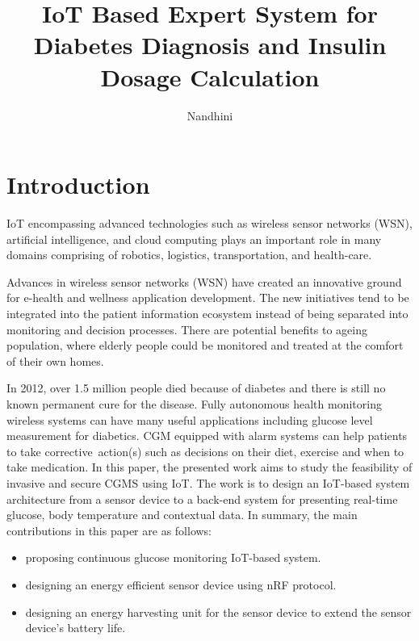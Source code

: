 \documentclass{article}
\begin{document}
\title{IoT Based Expert System for Diabetes Diagnosis and Insulin
Dosage Calculation}
\author{Nandhini}
\maketitle

\section{ Introduction}

IoT encompassing advanced technologies such as wireless sensor networks (WSN), artificial intelligence,
and cloud computing plays an important role in many domains comprising of robotics, logistics, transportation, and
health-care.

Advances in wireless sensor networks (WSN) have created an innovative ground for e-health and wellness application development. The new initiatives tend to be integrated into the patient information ecosystem instead of being separated into monitoring and decision processes. There are potential benefits to ageing population, where elderly people could be monitored and treated at the comfort of their own homes.

In 2012, over 1.5 million people died because of diabetes and there is still no known permanent cure for the disease. Fully autonomous health monitoring wireless systems can have many useful applications including glucose level measurement for diabetics. CGM equipped with alarm systems can help patients to take corrective action(s) such as decisions on their diet, exercise and when to take medication.
In this paper, the presented work aims to study the feasibility of invasive and secure CGMS using IoT. The work is to design an IoT-based system architecture from a sensor device to a back-end system for presenting real-time glucose, body temperature and contextual data. In summary, the main contributions in this paper are as follows:

\begin{itemize}

 \item proposing continuous glucose monitoring IoT-based system.
 \item designing an energy efficient sensor device using nRF protocol.
 \item designing an energy harvesting unit for the sensor device to extend the sensor device’s battery life.
\end{itemize}
\end{document}
